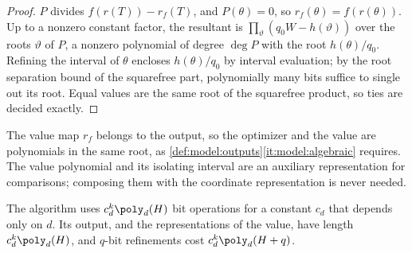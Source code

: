 \begin{proof}
$P$ divides $f(r(T))-r_f(T)$, and $P(\theta)=0$, so $r_f(\theta)=f(r(\theta))$.
Up to a nonzero constant factor, the resultant is
$\prod_\vartheta(q_0W-h(\vartheta))$ over the roots $\vartheta$ of $P$, a
nonzero polynomial of degree $\deg P$ with the root $h(\theta)/q_0$. Refining
the interval of $\theta$ encloses $h(\theta)/q_0$ by interval evaluation; by the
root separation bound of the squarefree part, polynomially many bits suffice
to single out its root. Equal values are the same root of the squarefree
product, so ties are decided exactly.
\end{proof}

The value map $r_f$ belongs to the output, so the optimizer and the value are
polynomials in the same root, as \cref{def:model:outputs}\ref{it:model:algebraic}
requires. The value polynomial and its isolating interval are an auxiliary
representation for comparisons; composing them with the coordinate
representation is never needed.

\begin{lemma}[Cost]\label{lem:int:cost}
The algorithm uses $c_d^k\poly_d(H)$ bit operations for a constant $c_d$ that
depends only on $d$. Its output, and the representations of the value, have
length $c_d^k\poly_d(H)$, and $q$-bit refinements cost $c_d^k\poly_d(H+q)$.
\end{lemma}

